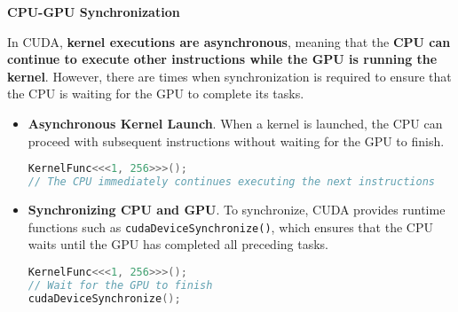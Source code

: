\highspace
\begin{flushleft}
    \textcolor{Green3}{ \textbf{CPU-GPU Synchronization}}
\end{flushleft}
In CUDA, \textbf{kernel executions are asynchronous}, meaning that the \textbf{CPU can continue to execute other instructions while the GPU is running the kernel}. However, there are times when synchronization is required to ensure that the CPU is waiting for the GPU to complete its tasks.
\begin{itemize}
    \item \textbf{Asynchronous Kernel Launch}. When a kernel is launched, the CPU can proceed with subsequent instructions without waiting for the GPU to finish.
\begin{lstlisting}[language=C++]
KernelFunc<<<1, 256>>>();
// The CPU immediately continues executing the next instructions
\end{lstlisting}

    \item \textbf{Synchronizing CPU and GPU}. To synchronize, CUDA provides runtime functions such as \texttt{cudaDeviceSynchronize()}, which ensures that the CPU waits until the GPU has completed all preceding tasks.
\begin{lstlisting}[language=C++]
KernelFunc<<<1, 256>>>();
// Wait for the GPU to finish
cudaDeviceSynchronize();
\end{lstlisting}
\end{itemize}
